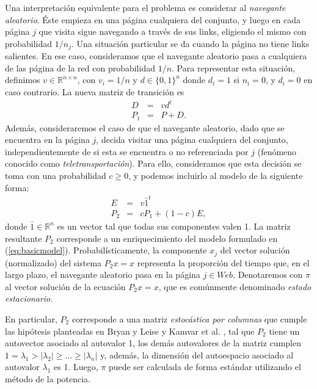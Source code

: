 \documentclass[11pt, a4paper]{article}
\begin{document}
Una interpretaci\'on equivalente para el problema es considerar al \emph{navegante aleatorio}. \'Este empieza en una
p\'agina cualquiera del conjunto, y luego en cada p\'agina $j$ que visita sigue navegando a trav\'es de sus links,
eligiendo el mismo con probabilidad $1/n_j$. Una situaci\'on particular se da cuando la p\'agina no tiene links salientes. En
ese caso, consideramos que el navegante aleatorio pasa a cualquiera de las p\'agina de la red con probabilidad $1/n$.
Para representar esta situaci\'on, definimos $v \in \mathbb{R}^{n \times n}$, con $v_i = 1/n$ y $d \in \{0,1\}^{n}$ donde 
$d_i = 1$ si $n_i = 0$, y $d_i = 0$ en caso contrario. La nueva matriz de transici\'on es 
\begin{eqnarray*}
D & = & v d^t \\
P_1 & = & P + D.
\end{eqnarray*}
Adem\'as, consideraremos el caso de que el navegante aleatorio, dado que se encuentra en la p\'agina $j$, decida visitar
una p\'agina cualquiera del conjunto, independientemente de si esta se encuentra o no referenciada por $j$ (fen\'omeno
conocido como \emph{teletransportaci\'on}). Para ello, consideramos que esta decisi\'on se toma con una probabilidad
$c \ge 0$, y podemos incluirlo al modelo de la siguiente forma:
\begin{eqnarray*}
E & = & v \bar{1}^t \\
P_2 & = & cP_1 + (1-c)E,
\end{eqnarray*}
\noindent donde $\bar{1} \in \mathbb{R}^n$ es un vector tal que todas sus componentes valen 1. La matriz resultante
$P_2$ corresponde a un enriquecimiento del modelo formulado en (\ref{eq:basicmodel}). Probabil\'isticamente, la
componente $x_j$ del vector soluci\'on (normalizado) del sistema $P_2 x = x$ representa la proporci\'on del tiempo que,
en el largo plazo, el navegante aleatorio pasa en la p\'agina $j \in Web$. Denotaremos con $\pi$ al vector soluci\'on 
de la ecuaci\'on $P_2 x = x$, que es com\'unmente denominado \emph{estado estacionario}.

En particular, $P_2$ corresponde a una
matriz \emph{estoc\'astica por columnas} que cumple las hip\'otesis planteadas en Bryan y Leise \cite{Bryan2006} y
Kamvar et al. \cite{Kamvar2003}, tal que $P_2$ tiene un autovector asociado al autovalor 1, los dem\'as autovalores de
la matriz cumplen $1 = \lambda_1 > |\lambda_2| \ge \dots \ge |\lambda_n|$ y, adem\'as, la dimensi\'on
del autoespacio asociado al autovalor $\lambda_1$ es 1. Luego, $\pi$ puede ser calculada
de forma est\'andar utilizando el m\'etodo de la potencia.
\end{document}
